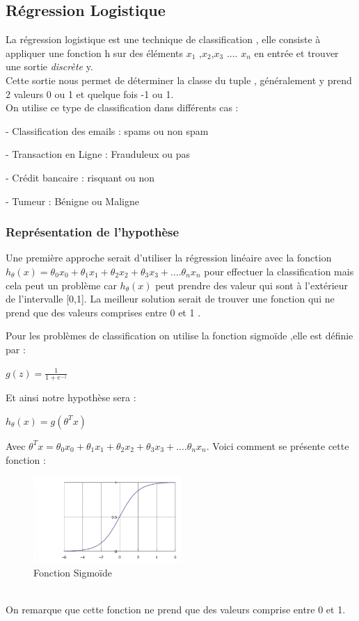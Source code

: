  \subsection{Régression Logistique  }
 La régression logistique est une technique de classification , elle consiste à appliquer une fonction h sur des éléments ${x}_{1}$ ,${x}_{2}$,${x}_{3}$ .... ${x}_{n}$ en entrée et trouver une sortie \emph{discrète} y. \\
 Cette sortie nous permet de déterminer la classe du tuple , généralement y prend 2 valeurs 0 ou 1 et quelque fois -1  ou 1.\\
 On utilise ce type de classification dans différents cas :

 - Classification des emails : spams ou non spam

 - Transaction en Ligne : Frauduleux ou pas

 - Crédit bancaire : risquant ou non

 - Tumeur : Bénigne ou Maligne

\subsubsection{Représentation de l'hypothèse}
Une première approche serait d'utiliser la régression linéaire avec la fonction ${h}_{\theta}\left(x\right)={\theta }_{0}{x}_{0}+{\theta }_{1}{x}_{1}+{\theta }_{2}{x}_{2}+{\theta }_{3}{x}_{3}+....{\theta }_{n}{x}_{n}$  pour effectuer la classification mais cela peut un problème car ${h}_{\theta}\left(x\right)$ peut prendre des valeur qui sont à l'extérieur de  l'intervalle [0,1].
La meilleur solution serait de trouver une fonction qui ne prend que des valeurs comprises entre 0 et 1 .

Pour les problèmes de classification on utilise la fonction sigmoïde ,elle est définie par :

\begin{center}
	$g(z) =\frac{1}{1+{e}^{-z}}$
\end{center}
Et ainsi notre hypothèse sera :
\begin{center}
	${h}_{\theta}\left(x\right)=g({\theta }^{T}{x})$
\end{center}
Avec ${\theta }^{T}{x}={\theta }_{0}{x}_{0}+{\theta }_{1}{x}_{1}+{\theta }_{2}{x}_{2}+{\theta }_{3}{x}_{3}+....{\theta }_{n}{x}_{n}$.
Voici comment se présente cette fonction :
\begin{figure}[ht]
	\centering
	\includegraphics[width=0.5\textwidth]{fig/FonctionSigm.png}
	\caption{Fonction Sigmoïde}
	\label{fig:image4}
\end{figure} \\
On remarque que cette fonction ne prend que des valeurs comprise entre 0 et 1.

